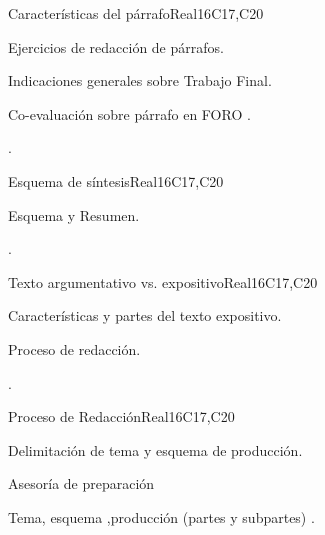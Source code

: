 \begin{syllabus}
\begin{unit}{Características del párrafo}{}{Real}{16}{C17,C20}
  \begin{topics}
      \item Ejercicios de redacción de párrafos.
      \item Indicaciones generales sobre Trabajo Final.
      \item Co-evaluación sobre párrafo en FORO .
  \end{topics}

  \begin{learningoutcomes}
   \item .%
  \end{learningoutcomes}
\end{unit}

\begin{unit}{Esquema de síntesis}{}{Real}{16}{C17,C20}
  \begin{topics}
      \item Esquema y Resumen.
  \end{topics}

  \begin{learningoutcomes}
   \item .%
  \end{learningoutcomes}
\end{unit}

\begin{unit}{Texto argumentativo vs. expositivo}{}{Real}{16}{C17,C20}
  \begin{topics}
      \item Características y partes del texto expositivo.
      \item Proceso de redacción.
  \end{topics}

  \begin{learningoutcomes}
   \item .%
  \end{learningoutcomes}
\end{unit}

\begin{unit}{Proceso de Redacción}{}{Real}{16}{C17,C20}
  \begin{topics}
      \item Delimitación de tema y esquema de producción.
      \item Asesoría de preparación
      \item Tema, esquema ,producción (partes y subpartes) .
  \end{topics}


\end{unit}
\end{syllabus}
